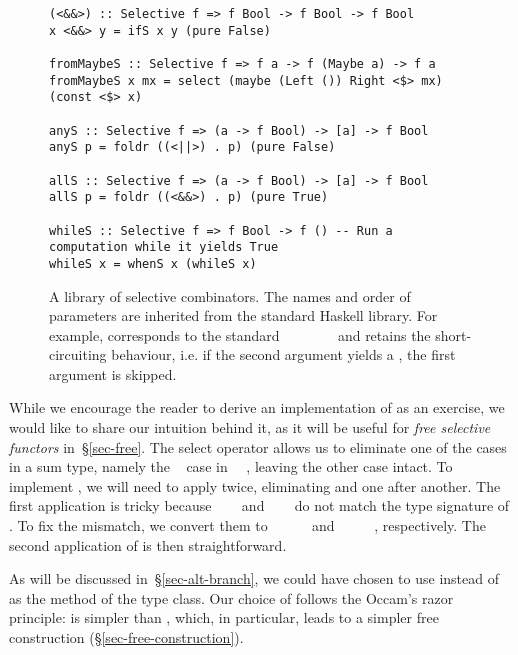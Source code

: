 {\begin{figure}
\begin{verbatim}
(<&&>) :: Selective f => f Bool -> f Bool -> f Bool
x <&&> y = ifS x y (pure False)

fromMaybeS :: Selective f => f a -> f (Maybe a) -> f a
fromMaybeS x mx = select (maybe (Left ()) Right <$> mx) (const <$> x)

anyS :: Selective f => (a -> f Bool) -> [a] -> f Bool
anyS p = foldr ((<||>) . p) (pure False)

allS :: Selective f => (a -> f Bool) -> [a] -> f Bool
allS p = foldr ((<&&>) . p) (pure True)

whileS :: Selective f => f Bool -> f () -- Run a computation while it yields True
whileS x = whenS x (whileS x)
\end{verbatim}
\caption{A library of selective combinators. The names and order of parameters
are inherited from the standard Haskell library. For example, 
corresponds to the standard
~\hs{::}~~\hs{->}~~~\hs{->}~ and
retains the short-circuiting behaviour, i.e. if the second argument yields a
, the first argument is skipped.}
\label{fig-library}
\end{figure}


\noindent
While we encourage the reader to derive an implementation of  as an
exercise, we would like to share our intuition behind it, as it will be useful
for \emph{free selective functors} in~\S\ref{sec-free}. The select operator
allows us to eliminate one of the cases in a sum type, namely the
~ case in ~~, leaving the other case
intact. To implement , we will need to apply  twice,
eliminating  and  one after another. The first application is tricky
because ~~~ and
~\hs{(}~\hs{->}~ do not match the type signature of .
To fix the mismatch, we convert them to
~~~\hs{(}~~ and
~\hs{(}~\hs{->}~~~, respectively. The second
application of  is then straightforward.

As will be discussed in~\S\ref{sec-alt-branch}, we could have chosen to use
 instead of  as the method of the  type
class. Our choice of  follows the Occam's razor principle:
 is simpler than , which, in particular, leads to a
simpler free construction (\S\ref{sec-free-construction}).

}
